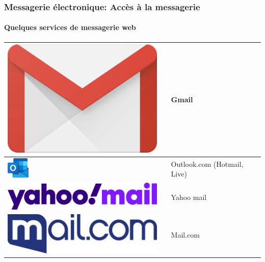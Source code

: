 \documentclass{beamer}
\begin{document}
\begin{frame}
\frametitle{Messagerie électronique: Accès à la messagerie}
\framesubtitle{Quelques services de messagerie web}

\begin{tabular}{L{.3\textwidth}{1cm}cp{.6\textwidth}}%
	
	\hline
	
	\includegraphics[height=.6cm]{..//img/Bweb02-ri-gmail/gmail-logo.png} &
	&
	Gmail \\
	
	\hline
	
	\includegraphics[height=1cm]{..//img/Bweb02-ri-gmail/outlook-logo.png} &
	& 
	Outlook.com (Hotmail, Live)  \\
	
	\hline
	
	\includegraphics[height=.7cm]{..//img/Bweb02-ri-gmail/yahoomail-logo.png} &
	& 
	Yahoo mail \\
	
	\hline
	
	\includegraphics[height=.7cm]{..//img/Bweb02-ri-gmail/mailcom-logo.jpg} & 
	& 
	Mail.com \\
	
	\hline
	
\end{tabular}

\end{frame}
\end{document}
